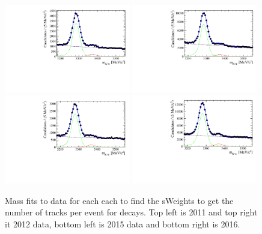 \begin{figure}[ht]
  \centering
    \includegraphics[width=0.49\textwidth]{./Figs/LifetimeMeasurement/Bd2KPi_2011_mass_fit.pdf}
    \includegraphics[width=0.49\textwidth]{./Figs/LifetimeMeasurement/Bd2KPi_2012_mass_fit.pdf}
    \includegraphics[width=0.49\textwidth]{./Figs/LifetimeMeasurement/Bd2KPi_2015_mass_fit.pdf}
    \includegraphics[width=0.49\textwidth]{./Figs/LifetimeMeasurement/Bd2KPi_2016_mass_fit.pdf}
  \caption{Mass fits to \bdkpi data for each each to find the sWeights to get the number of tracks per event for \bdkpi decays. Top left is 2011 and top right it 2012 data, bottom left is 2015 data and bottom right is 2016.}
  \label{fig:ntracksmassifts}
\end{figure}
\FloatBarrier


